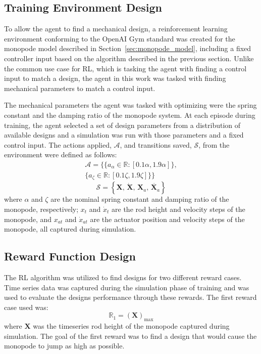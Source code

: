 \documentclass[10pt,twocolumn,letterpaper]{article}
\begin{document}
\subsection{Training Environment Design}
%
To allow the agent to find a mechanical design, a reinforcement learning environment conforming to the OpenAI Gym standard \cite{Brockman2016c} was created for the monopode model described in Section~\ref{sec:monopode_model}, including a fixed controller input based on the algorithm described in the previous section. Unlike the common use case for RL, which is tasking the agent with finding a control input to match a design, the agent in this work was tasked with finding mechanical parameters to match a control input.

The mechanical parameters the agent was tasked with optimizing were the spring constant and the damping ratio of the monopode system. At each episode during training, the agent selected a set of design parameters from a distribution of available designs and a simulation was run with those parameters and a fixed control input. The actions applied, $\mathcal{A}$, and transitions saved, $\mathcal{S}$, from the environment were defined as follows:
%
\begin{equation}
        \label{eq:action}
        \begin{aligned}
        \mathcal{A} = \{ \{ a_{\alpha} \in \mathbb{R}: [0.1 \alpha, 1.9 \alpha] \}, \\ 
        \{ a_{\zeta} \in \mathbb{R}: [0.1 \zeta, 1.9 \zeta] \} \}
        \end{aligned}
\end{equation} 
%
\begin{equation}
        \label{eq:transitions}
        \mathcal{S}= \left \{ \textbf{X}, \, \dot{\textbf{X}}, \, \textbf{X}_a, \, \dot{\textbf{X}_a}  \right \}
\end{equation}
%
where $\alpha$ and $\zeta$ are the nominal spring constant and damping ratio of the monopode, respectively; $x_t$ and $\dot{x}_t$ are the rod height and velocity steps of the monopode, and $x_{at}$ and $\dot{x}_{at}$ are the actuator position and velocity steps of the monopode, all captured during simulation. 

\subsection{Reward Function Design}

The RL algorithm was utilized to find designs for two different reward cases. Time series data was captured during the simulation phase of training and was used to evaluate the designs performance through these rewards. The first reward case used was:
%
\begin{equation}
        \mathbb{R}_1 = \left (\textbf{X}  \right )_{\text{max}}
\end{equation}
% 
where $\textbf{X}$ was the timeseries rod height of the monopode captured during simulation. The goal of the first reward was to find a design that would cause the monopode to jump as high as possible.
\end{document}
